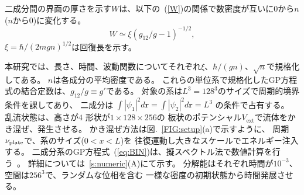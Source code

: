 \documentclass[12pt,a4paper]{jbook}
\begin{document}
        二成分間の界面の厚さを示す$W$は、以下の~(\ref{W})の関係で数密度が互いに$0$から$n$($n$から$0$)に変化する。
        \begin{equation} \label{W}
            W \simeq \xi (g_{12} / g - 1)^{-1/2},
        \end{equation}
        $\xi = \hbar / (2mgn)^{1/2}$は回復長を示す。


        本研究では、長さ、時間、波動関数についてそれぞれ$\xi$、$\hbar / (gn)$、$\sqrt{n}$で規格化してある。
        $n$は各成分の平均密度である。
        これらの単位系で規格化したGP方程式の結合定数は、$g_{12} / g \equiv g'$である。
        対象の系は$L^3=128^3$のサイズで周期的境界条件を課してあり、
        二成分は
        $\int |\psi_1|^2 d\bm{r} =\int |\psi_2|^2 d\bm{r} = L^3$
        の条件で占有する。
        乱流状態は、高さが$4$
        形状が$1 \times 128 \times 256$の
        板状のポテンシャル$V_{\textrm{ext}}$で流体をかき混ぜ、発生させる。
        かき混ぜ方法は図.~\ref{FIG:setup}(a)で示すように、
        周期$\nu_{\rm plate}$で、系のサイズ($0 < x < L$)を
        往復運動し大きなスケールでエネルギー注入する。
        二成分系のGP方程式~(\ref{eq:BIN})は、擬スペクトル法で数値計算を行う~\cite{Recipe}。
        詳細については~\ref{s:numeric}(A)にて示す。
        分解能はそれぞれ時間が$10^{-3}$、空間は$256^3$で、ランダムな位相を含む
        一様な密度の初期状態から時間発展させる。
\end{document}
